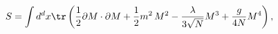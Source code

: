 \begin{equation}
    S=\int d^dx \tr\left(\frac 1 2\partial M\cdot \partial M+\frac 1 2
    m^2\,M^2-\frac{\lambda}{3\sqrt N}M^3+\frac{g}{4N}M^4\right),
\end{equation}


